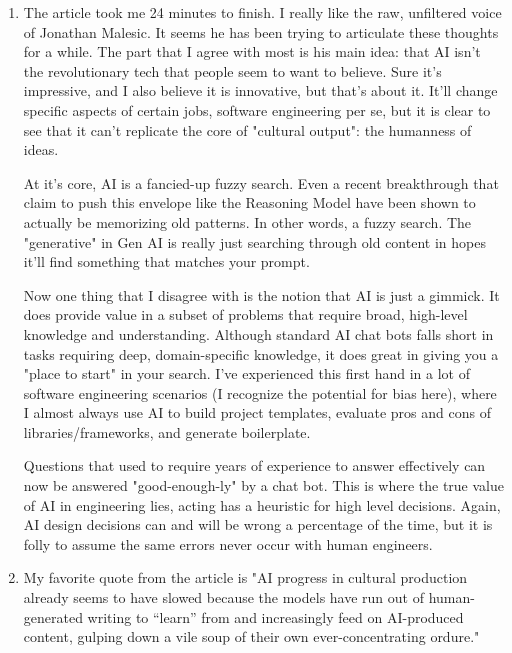 \documentclass{article}
\begin{document}
\begin{enumerate}
    \item {
        The article took me 24 minutes to finish. I really like the raw, unfiltered
        voice of Jonathan Malesic. It seems he has been trying to articulate 
        these thoughts for a while. The part that I agree with most is his main 
        idea: that AI isn't the revolutionary tech that people seem to want to 
        believe. Sure it's impressive, and I also believe it is innovative, but 
        that's about it. It'll change specific aspects of certain jobs,
        software engineering per se, but it is clear to see that it can't replicate
        the core of "cultural output": the humanness of ideas.

        At it's core, AI is a fancied-up fuzzy search. Even a recent breakthrough
        that claim to push this envelope like the Reasoning Model have been shown 
        to actually be memorizing old patterns. In other words, a fuzzy search. 
        The "generative" in Gen AI is really just searching through old content in 
        hopes it'll find something that matches your prompt. 

        Now one thing that I disagree with is the notion that AI is just a gimmick. 
        It does provide value in a subset of problems that require broad, high-level
        knowledge and understanding. Although standard AI chat bots falls short 
        in tasks requiring deep, domain-specific knowledge, it does great in giving
        you a "place to start" in your search. I've experienced this first hand 
        in a lot of software engineering scenarios (I recognize the potential for
        bias here), where I almost always use AI to build project templates, 
        evaluate pros and cons of libraries/frameworks, and generate boilerplate. 

        Questions that used to require years of experience to answer effectively
        can now be answered "good-enough-ly" by a chat bot. This is where the true 
        value of AI in engineering lies, acting has a heuristic for high level decisions.
        Again, AI design decisions can and will be wrong a percentage of the time,
        but it is folly to assume the same errors never occur with human engineers.
    
    }

    \item {
        My favorite quote from the article is "AI progress in cultural production 
        already seems to have slowed because the models have run out of 
        human-generated writing to “learn” from and increasingly feed on AI-produced 
        content, gulping down a vile soup of their own ever-concentrating ordure." 

}
\end{enumerate}
\end{document}
